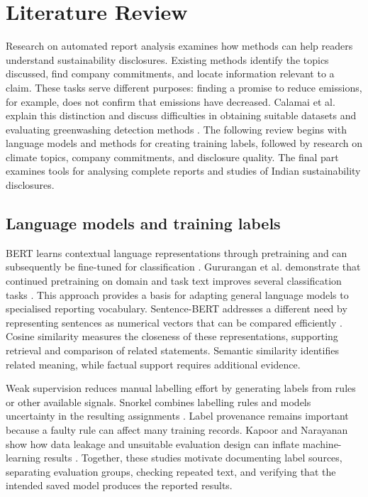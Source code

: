 \section{Literature Review}
\label{sec:literature}

Research on automated report analysis examines how methods can help readers understand sustainability disclosures. Existing methods identify the topics discussed, find company commitments, and locate information relevant to a claim. These tasks serve different purposes: finding a promise to reduce emissions, for example, does not confirm that emissions have decreased. Calamai et al. explain this distinction and discuss difficulties in obtaining suitable datasets and evaluating greenwashing detection methods \cite{calamai2025}. The following review begins with language models and methods for creating training labels, followed by research on climate topics, company commitments, and disclosure quality. The final part examines tools for analysing complete reports and studies of Indian sustainability disclosures.

\subsection{Language models and training labels}

BERT learns contextual language representations through pretraining and can subsequently be fine-tuned for classification \cite{devlin2019}. Gururangan et al. demonstrate that continued pretraining on domain and task text improves several classification tasks \cite{gururangan2020}. This approach provides a basis for adapting general language models to specialised reporting vocabulary. Sentence-BERT addresses a different need by representing sentences as numerical vectors that can be compared efficiently \cite{reimers2019}. Cosine similarity measures the closeness of these representations, supporting retrieval and comparison of related statements. Semantic similarity identifies related meaning, while factual support requires additional evidence.

Weak supervision reduces manual labelling effort by generating labels from rules or other available signals. Snorkel combines labelling rules and models uncertainty in the resulting assignments \cite{ratner2017}. Label provenance remains important because a faulty rule can affect many training records. Kapoor and Narayanan show how data leakage and unsuitable evaluation design can inflate machine-learning results \cite{kapoor2023}. Together, these studies motivate documenting label sources, separating evaluation groups, checking repeated text, and verifying that the intended saved model produces the reported results.

